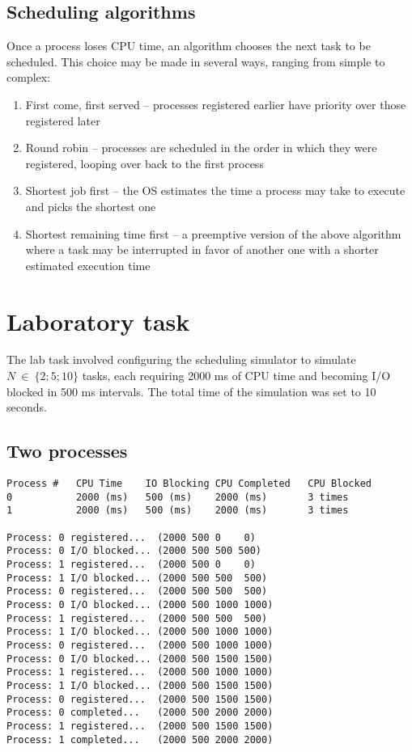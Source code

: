 \documentclass{article}
\begin{document}
    \subsection{Scheduling algorithms}
    
    Once a process loses CPU time, an algorithm chooses the next task to be
    scheduled. This choice may be made in several ways, ranging from simple to
    complex:
    
    \begin{enumerate}
        \item First come, first served -- processes registered earlier have
        priority over those registered later
        \item Round robin -- processes are scheduled in the order in which they
        were registered, looping over back to the first process
        \item Shortest job first -- the OS estimates the time a process may
        take to execute and picks the shortest one
        \item Shortest remaining time first -- a preemptive version of the
        above algorithm where a task may be interrupted in favor of another one
        with a shorter estimated execution time
    \end{enumerate}
    
    \section{Laboratory task}
    
    The lab task involved configuring the scheduling simulator to simulate
    $N~\in~\{2;5;10\}$ tasks, each requiring 2000 ms of CPU time and becoming
    I/O blocked in 500 ms intervals. The total time of the simulation was set
    to 10 seconds.
    
    \subsection{Two processes}
    
    \begin{verbatim}
Process #   CPU Time    IO Blocking CPU Completed   CPU Blocked
0           2000 (ms)   500 (ms)    2000 (ms)       3 times
1           2000 (ms)   500 (ms)    2000 (ms)       3 times

Process: 0 registered...  (2000 500 0    0)
Process: 0 I/O blocked... (2000 500 500 500)
Process: 1 registered...  (2000 500 0    0)
Process: 1 I/O blocked... (2000 500 500  500)
Process: 0 registered...  (2000 500 500  500)
Process: 0 I/O blocked... (2000 500 1000 1000)
Process: 1 registered...  (2000 500 500  500)
Process: 1 I/O blocked... (2000 500 1000 1000)
Process: 0 registered...  (2000 500 1000 1000)
Process: 0 I/O blocked... (2000 500 1500 1500)
Process: 1 registered...  (2000 500 1000 1000)
Process: 1 I/O blocked... (2000 500 1500 1500)
Process: 0 registered...  (2000 500 1500 1500)
Process: 0 completed...   (2000 500 2000 2000)
Process: 1 registered...  (2000 500 1500 1500)
Process: 1 completed...   (2000 500 2000 2000)
    \end{verbatim}
	
\end{document}
